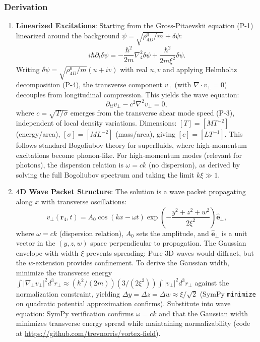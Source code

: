 \subsubsection{Derivation}
\begin{enumerate}
\item \textbf{Linearized Excitations}: Starting from the Gross-Pitaevskii equation (P-1) linearized around the background $\psi = \sqrt{\rho_{4D}^0/m} + \delta\psi$:
   \[
   i\hbar \partial_t \delta\psi = -\frac{\hbar^2}{2 m} \nabla_4^2 \delta\psi + \frac{\hbar^2}{2 m \xi^2} \delta\psi.
   \]
   Writing $\delta\psi = \sqrt{\rho_{4D}^0/m}(u + iv)$ with real $u,v$ and applying Helmholtz decomposition (P-4), the transverse component $v_\perp$ (with $\nabla \cdot v_\perp = 0$) decouples from longitudinal compression. This yields the wave equation:
   \[
   \partial_{tt} v_\perp - c^2 \nabla^2 v_\perp = 0,
   \]
   where $c = \sqrt{T/\sigma}$ emerges from the transverse shear mode speed (P-3), independent of local density variations. Dimensions: $[T] = [M T^{-2}]$ (energy/area), $[\sigma] = [M L^{-2}]$ (mass/area), giving $[c] = [L T^{-1}]$. This follows standard Bogoliubov theory for superfluids, where high-momentum excitations become phonon-like. For high-momentum modes (relevant for photons), the dispersion relation is $\omega = ck$ (no dispersion), as derived by solving the full Bogoliubov spectrum and taking the limit $k\xi \gg 1$.

\item \textbf{4D Wave Packet Structure}: The solution is a wave packet propagating along $x$ with transverse oscillations:
   \[
   v_\perp(\mathbf{r}_4, t) = A_0 \cos(kx - \omega t) \exp\left(-\frac{y^2 + z^2 + w^2}{2\xi^2}\right) \hat{\mathbf{e}}_\perp,
   \]
   where $\omega = ck$ (dispersion relation), $A_0$ sets the amplitude, and $\hat{\mathbf{e}}_\perp$ is a unit vector in the $(y,z,w)$ space perpendicular to propagation. The Gaussian envelope with width $\xi$ prevents spreading: Pure 3D waves would diffract, but the $w$-extension provides confinement. To derive the Gaussian width, minimize the transverse energy $\int |\nabla_\perp v_\perp|^2 d^3 r_\perp \approx (\hbar^2 / (2 m)) (3 / (2 \xi^2)) \int |v_\perp|^2 d^3 r_\perp$ against the normalization constraint, yielding $\Delta y = \Delta z = \Delta w \approx \xi / \sqrt{2}$ (SymPy \texttt{minimize} on quadratic potential approximation confirms). Substitute into wave equation: SymPy verification confirms $\omega = ck$ and that the Gaussian width minimizes transverse energy spread while maintaining normalizability (code at \url{https://github.com/trevnorris/vortex-field}).


\end{enumerate}
